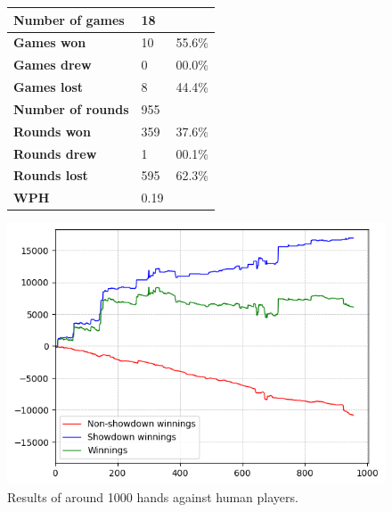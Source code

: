 \begin{figure}[H]
    \centering
    \begin{minipage}{\textwidth}
        \begin{minipage}{0.40\textwidth}
            \begin{tabular}{|l|l|l|}
                \hline
                \textbf{Number of games}  & 18   &        \\ \hline
                \textbf{Games won}        & 10    & 55.6\% \\ \hline
                \textbf{Games drew}       & 0     & 00.0\%  \\ \hline
                \textbf{Games lost}       & 8    & 44.4\% \\ \hline
                \textbf{Number of rounds} & 955  &        \\ \hline
                \textbf{Rounds won}       & 359  & 37.6\% \\ \hline
                \textbf{Rounds drew}      & 1     & 00.1\%  \\ \hline
                \textbf{Rounds lost}      & 595  & 62.3\% \\ \hline
                \textbf{WPH}              & 0.19  &        \\ \hline
            \end{tabular}
        \end{minipage}
        \hspace{0.05\textwidth}
        \begin{minipage}{0.5\textwidth}
            \includegraphics[width=\textwidth]{graphics/human.png}
        \end{minipage}
    \end{minipage}
    \caption{Results of around 1000 hands against human players.}
    \label{fig:results_human}
\end{figure}

